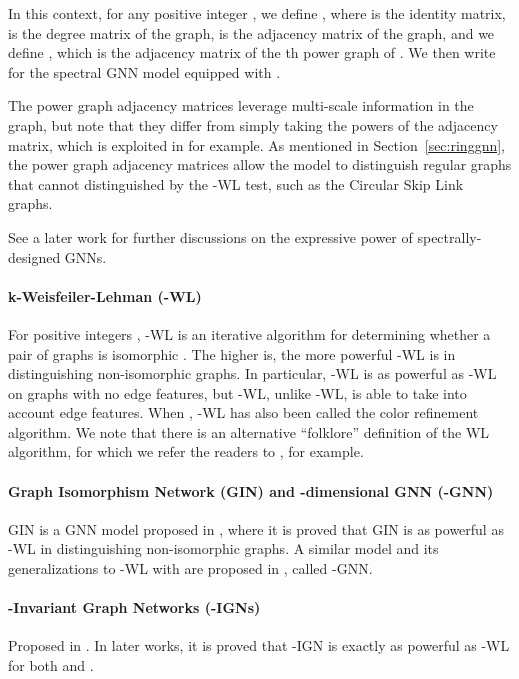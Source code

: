 \documentclass{article}
\begin{document}
In this context, for any positive integer , we define , where  is the identity matrix,  is the degree matrix of the graph,  is the adjacency matrix of the graph, and we define , which is the adjacency matrix of the th power graph of .
We then write  for the spectral GNN model equipped with .

The power graph adjacency matrices leverage multi-scale information in the graph, but note that they differ from simply taking the powers of the adjacency matrix, which is exploited in \cite{liao2018lanczosnet} for example. As mentioned in Section~\ref{sec:ringgnn}, the power graph adjacency matrices allow the model to distinguish regular graphs that cannot distinguished by the -WL test, such as the Circular Skip Link graphs. 

See a later work \cite{wang2022powerful} for further discussions on the expressive power of spectrally-designed GNNs.

\paragraph{k-Weisfeiler-Lehman (-WL)} For positive integers , -WL is an iterative algorithm for determining whether a pair of graphs is isomorphic \cite{weisfeiler1968reduction}. The higher  is, the more powerful -WL is in distinguishing non-isomorphic graphs. In particular, -WL is as powerful as -WL on graphs with no edge features, but -WL, unlike -WL, is able to take into account edge features. When , -WL has also been called the color refinement algorithm. We note that there is an alternative ``folklore'' definition of the WL algorithm, for which we refer the readers to \cite{cai1992optimal, maron2019provably}, for example.

\paragraph{Graph Isomorphism Network (GIN) and -dimensional GNN (-GNN)} GIN is a GNN model proposed in \cite{xu2018powerful}, where it is proved that GIN is as powerful as -WL in distinguishing non-isomorphic graphs. A similar model and its generalizations to -WL with  are proposed in \cite{morris2019higher}, called -GNN.

\paragraph{-Invariant Graph Networks (-IGNs)} Proposed in \cite{maron2018invariant, maron2019universality}. In later works, it is proved that -IGN is exactly as powerful as -WL for both  \cite{chen2020can} and  \cite{geerts2020expressive, geerts2022expressiveness}.
\end{document}
